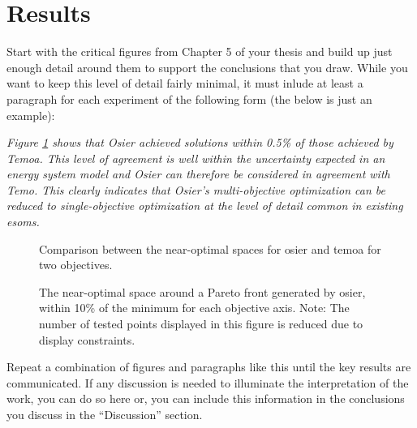 \section{Results}
Start with the critical figures from Chapter 5 of your thesis and build up just
enough detail around them to support the conclusions that you draw. While you
want to keep this level of detail fairly minimal, it must inlude at least a
paragraph for each experiment of the following form (the below is just an
example):

\emph{Figure \ref{fig:osier-temoa-benchmark} shows that Osier achieved solutions
within 0.5\%  of those achieved by Temoa. This level of agreement is well within
the uncertainty expected in an energy system model and Osier can therefore be
considered in agreement with Temo. This clearly indicates that Osier's
multi-objective optimization can be reduced to single-objective optimization at
the level of detail common in existing \glspl{esom}. }

\begin{figure}
    \begin{center}
        \resizebox{\columnwidth}{!}{}
        \caption{Comparison between the near-optimal spaces for \gls{osier} and
        \gls{temoa} for two objectives.}
        \label{fig:osier-temoa-benchmark}
    \end{center}
\end{figure}

\begin{figure}
    \begin{center}
        \resizebox{\columnwidth}{!}{}
        \caption{The near-optimal space around a Pareto front generated by
        \gls{osier}, within 10\% of the minimum for each objective axis. Note:
        The number of tested points displayed in this figure is reduced due to
        display constraints.}
        \label{fig:osier-near-optimal}
    \end{center}
\end{figure}

Repeat a combination of figures and paragraphs like this until the key results
are communicated. If any discussion is needed to illuminate the interpretation
of the work, you can do so here or, you can include this information in the
conclusions you discuss in the ``Discussion'' section. 
